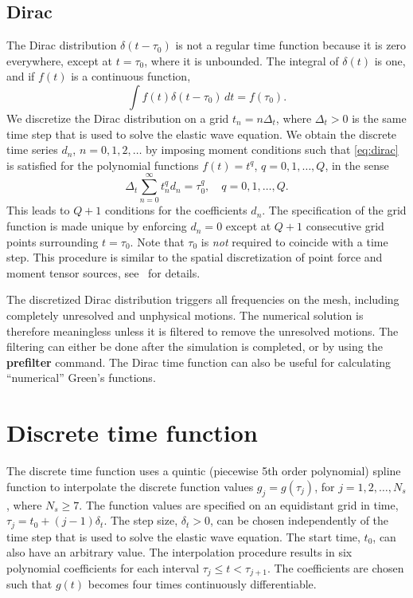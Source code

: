 \documentclass[11pt]{report}
\begin{document}
\subsection{Dirac}
The Dirac distribution $\delta(t-\tau_0)$ is not a regular time function because it is zero everywhere,
except at $t=\tau_0$, where it is unbounded. The integral of $\delta(t)$ is one, and if $f(t)$ is a
continuous function,
\begin{equation}\label{eq:dirac}
\int f(t)\delta(t-\tau_0)\, dt = f(\tau_0).
\end{equation}
We discretize the Dirac distribution on a grid $t_n = n\Delta_t$, where $\Delta_t>0$ is the same
time step that is used to solve the elastic wave equation. We obtain the discrete time series $d_n$,
$n=0,1,2,\ldots$ by imposing moment conditions such that \eqref{eq:dirac} is satisfied for the
polynomial functions $f(t)=t^q$, $q=0,1,\ldots,Q$, in the sense
\[
\Delta_t \sum_{n=0}^\infty t_n^q d_n = \tau_0^q,\quad q=0,1,\ldots,Q. 
\]
This leads to $Q+1$ conditions for the coefficients $d_n$. The specification of the grid function is
made unique by enforcing $d_n=0$ except at $Q+1$ consecutive grid points surrounding $t=\tau_0$. Note
that $\tau_0$ is {\em not} required to coincide with a time step. This procedure is similar to the
spatial discretization of point force and moment tensor sources, see~\cite{PetSjo-10} for details.

The discretized Dirac distribution triggers all frequencies on the mesh, including completely
unresolved and unphysical motions. The numerical solution is therefore meaningless unless it is
filtered to remove the unresolved motions. The filtering can either be done after the simulation is
completed, or by using the {\bf prefilter} command. The Dirac time function can also be useful for
calculating ``numerical'' Green's functions.

\section{Discrete time function}

The discrete time function uses a quintic (piecewise 5th order polynomial) spline function to
interpolate the discrete function values $g_j = g(\tau_j)$, for $j=1,2,\ldots, N_s$, where $N_s\geq
7$. The function values are specified on an equidistant grid in time, $\tau_j = t_0 + (j-1)
\delta_t$. The step size, $\delta_t>0$, can be chosen independently of the time step that is used to
solve the elastic wave equation. The start time, $t_0$, can also have an arbitrary value. The
interpolation procedure results in six polynomial coefficients for each interval $\tau_j\leq t
<\tau_{j+1}$. The coefficients are chosen such that $g(t)$ becomes four times continuously
differentiable.
\end{document}
